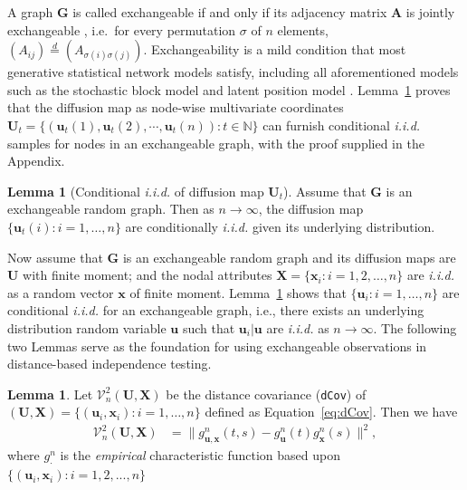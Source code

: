 \documentclass[11pt]{article}
\theoremstyle{definition}
\newtheorem{lemma}[theorem]{Lemma}
\begin{document}
A graph $\mathbf{G}$ is called exchangeable if and only if its adjacency matrix $\mathbf{A}$ is jointly exchangeable \cite{orbanz2015bayesian}, i.e.~for every permutation $\sigma$ of $n$ elements, $(A_{ij}) \stackrel{d}{=} (A_{\sigma(i) \sigma(j)})$. Exchangeability is a mild condition that most generative statistical network models satisfy, including all aforementioned models such as the stochastic block model and latent position model \cite{rohe2011spectral, sussman2014consistent, todeschini2016exchangeable}. Lemma~\ref{main_lemma} proves that the diffusion map as node-wise multivariate coordinates $ \mathbf{U}_{t} =  \{ (\mathbf{u}_{t}(1), \mathbf{u}_{t}(2), \cdots, \mathbf{u}_{t}(n)   )    : t \in \mathbb{N} \}$ can furnish conditional \textit{i.i.d.} samples for nodes in an exchangeable graph, with the proof supplied in the Appendix.
\begin{lemma}[Conditional \textit{i.i.d.} of diffusion map $\mathbf{U}_{t}$]
	\label{main_lemma}
	Assume that $\mathbf{G}$ is an exchangeable random graph. Then as $n \rightarrow \infty$, the diffusion map $\{ \mathbf{u}_{t}(i) : i = 1, \ldots, n \}$ are conditionally \textit{i.i.d.} given its underlying distribution.  
\end{lemma}

Now assume that $\mathbf{G}$ is an exchangeable random graph and its diffusion maps are $\mathbf{U}$ with finite moment; and the nodal attributes $\mathbf{X}=\{ \mathbf{x}_{i}: i = 1,2, \ldots, n \}$ are \textit{i.i.d.} as a random vector $\mathbf{x}$ of finite moment. Lemma~\ref{main_lemma} shows that $\{ \mathbf{u}_{i} : i = 1, \ldots, n  \}$ are conditional \textit{i.i.d.} for an exchangeable graph, i.e., there exists an underlying distribution random variable $\mathbf{u}$ such that $\mathbf{u}_{i}|\mathbf{u}$ are \textit{i.i.d.} as $n \rightarrow \infty$. The following two Lemmas serve as the foundation for using exchangeable observations in distance-based independence testing. 

\begin{lemma}
	\label{lemma1}
	Let $\mathcal{V}^2_{n}(\mathbf{U}, \mathbf{X})$ be the distance covariance (\texttt{dCov}) of $(\mathbf{U}, \mathbf{X}) = \{  ( \mathbf{u}_{i}, \mathbf{x}_{i}  )  : i = 1, \ldots, n \}$ defined as Equation~\ref{eq:dCov}.
	Then we have 
\begin{eqnarray}
		\mathcal{V}^{2}_{n}(\mathbf{U},\mathbf{X}) &=   \|g_{\mathbf{u},\mathbf{x}}^{n}(t,s)-g_{\mathbf{u}}^{n}(t)g_{\mathbf{x}}^{n}(s)\|^{2},
\end{eqnarray}
	where $g_{\cdot}^{n}$ is the \textit{empirical} characteristic function based upon $\{(\mathbf{u}_{i},\mathbf{x}_{i}) : i=1,2,...,n\}$
\end{lemma}
\end{document}
